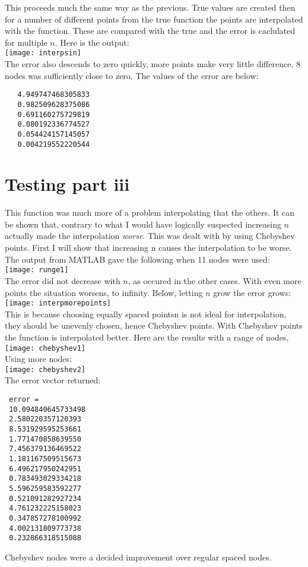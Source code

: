\documentclass[]{article}
\begin{document}
This proceeds much the same way as the previous. True values are created then for a number of different points from the true function the points are interpolated with the  function. These are compared with the true and the error is caclulated for multiple $ n $.  Here is the output: \\
\texttt{[image: interpsin]} \\
The error also descends to zero quickly, more points make very little difference. 8 nodes was sufficiently close to zero. The values of the error are below:
\begin{verbatim}
   4.949747468305833
   0.982509628375086
   0.691160275729819
   0.080192336774527
   0.054424157145057
   0.004219552220544
\end{verbatim}

\section*{Testing part iii} This function was much more of a problem interpolating that the others. It can be shown that, contrary to what I would have logically suspected increasing $ n $ actually made the interpolation \textit{worse}. This was dealt with by using Chebyshev points. First I will show that increasing n causes the interpolation to be worse. The output from MATLAB gave the following when 11 nodes were used: \\
\texttt{[image: runge1]} \\

The error did not decrease with $ n $, as occured in the other cases. With even more points the situation worsens, to infinity. Below, letting $ n $ grow the error grows: \\
\texttt{[image: interpmorepoints]} \\
 This is because choosing equally spaced pointsn is not ideal for interpolation, they should be unevenly chosen, hence Chebyshev points. 
 With Chebyshev points the function is interpolated better. Here are the results with a range of nodes, \\
 \texttt{[image: chebyshev1]} \\
  Using more nodes: \\
  \texttt{[image: chebyshev2]} \\
 The error vector returned:
 \begin{verbatim}
 error =
 10.094840645733498
 2.580220357120393
 8.531929595253661
 1.771470858639550
 7.456379136469522
 1.181167509515673
 6.496217950242951
 0.783493029334218
 5.596259583592277
 0.521091282927234
 4.761232225158023
 0.347857278100992
 4.002131809773738
 0.232866318515088
 \end{verbatim}
Chebyshev nodes were a decided improvement over regular spaced nodes. 
\end{document}
